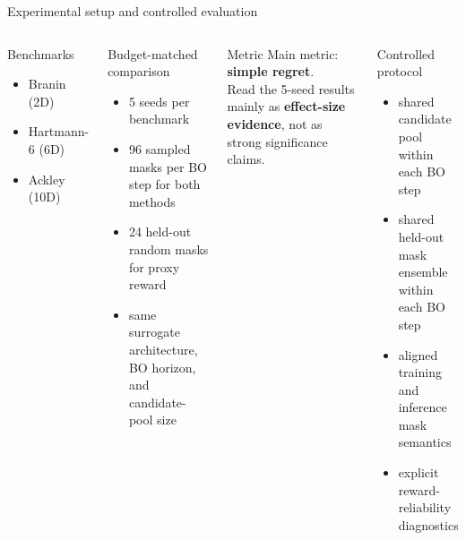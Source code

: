 \documentclass[aspectratio=169]{beamer}
\begin{document}
\begin{frame}{Experimental setup and controlled evaluation}
\vspace{-0.55em}
\begin{columns}[T,onlytextwidth]
\begin{minipage}[t][0.80\textheight]{\linewidth}\vspace{0pt}
  \begin{cardA}{Benchmarks}
  \begin{itemize}
    \item Branin (2D)
    \item Hartmann-6 (6D)
    \item Ackley (10D)
  \end{itemize}
  \end{cardA}

  \vfill

  \begin{card}{Budget-matched comparison}
  \begin{itemize}
    \item 5 seeds per benchmark
    \item 96 sampled masks per BO step for both methods
    \item 24 held-out random masks for proxy reward
    \item same surrogate architecture, BO horizon, and candidate-pool size
  \end{itemize}
  \end{card}

  \vfill

  \begin{card}{Metric}
  Main metric: \textbf{simple regret}.\\[0.2em]
  Read the 5-seed results mainly as \textbf{effect-size evidence}, not as strong significance claims.
  \end{card}
\end{minipage}

\begin{minipage}[t][0.80\textheight]{\linewidth}\vspace{0pt}
  \begin{cardW}{Controlled protocol}
  \begin{itemize}
    \item shared candidate pool within each BO step
    \item shared held-out mask ensemble within each BO step
    \item aligned training and inference mask semantics
    \item explicit reward-reliability diagnostics
  \end{itemize}
  \end{cardW}


\end{minipage}
\end{columns}
\end{frame}
\end{document}
